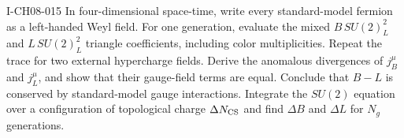 \begin{exercise}{I-CH08-015}
In four-dimensional space-time, write every standard-model fermion as a left-handed Weyl field.  For one
generation, evaluate the mixed $B\,SU(2)_L^2$ and
$L\,SU(2)_L^2$ triangle coefficients, including color multiplicities.
Repeat the trace for two external hypercharge fields.  Derive the anomalous
divergences of $j_B^\mu$ and $j_L^\mu$, and show that their gauge-field terms
are equal.  Conclude that $B-L$ is conserved by standard-model gauge
interactions.  Integrate the $SU(2)$ equation over a configuration of
topological charge $\Delta N_{\rm CS}$ and find $\Delta B$ and $\Delta L$ for
$N_g$ generations.
\end{exercise}
